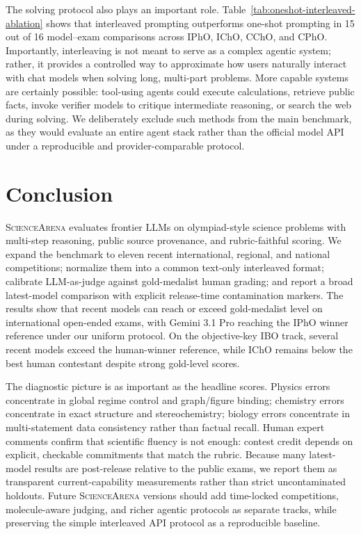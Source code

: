 \documentclass[11pt]{article}
\begin{document}
The solving protocol also plays an important role. Table~\ref{tab:oneshot-interleaved-ablation} shows that interleaved prompting outperforms one-shot prompting in 15 out of 16 model--exam comparisons across IPhO, IChO, CChO, and CPhO. Importantly, interleaving is not meant to serve as a complex agentic system; rather, it provides a controlled way to approximate how users naturally interact with chat models when solving long, multi-part problems. More capable systems are certainly possible: tool-using agents could execute calculations, retrieve public facts, invoke verifier models to critique intermediate reasoning, or search the web during solving. We deliberately exclude such methods from the main benchmark, as they would evaluate an entire agent stack rather than the official model API under a reproducible and provider-comparable protocol.




\section{Conclusion}
\textsc{ScienceArena} evaluates frontier LLMs on olympiad-style science problems with multi-step reasoning, public source provenance, and rubric-faithful scoring.
We expand the benchmark to eleven recent international, regional, and national competitions; normalize them into a common text-only interleaved format; calibrate LLM-as-judge against gold-medalist human grading; and report a broad latest-model comparison with explicit release-time contamination markers.
The results show that recent models can reach or exceed gold-medalist level on international open-ended exams, with Gemini 3.1 Pro reaching the IPhO winner reference under our uniform protocol.
On the objective-key IBO track, several recent models exceed the human-winner reference, while IChO remains below the best human contestant despite strong gold-level scores.

The diagnostic picture is as important as the headline scores.
Physics errors concentrate in global regime control and graph/figure binding; chemistry errors concentrate in exact structure and stereochemistry; biology errors concentrate in multi-statement data consistency rather than factual recall.
Human expert comments confirm that scientific fluency is not enough: contest credit depends on explicit, checkable commitments that match the rubric.
Because many latest-model results are post-release relative to the public exams, we report them as transparent current-capability measurements rather than strict uncontaminated holdouts.
Future \textsc{ScienceArena} versions should add time-locked competitions, molecule-aware judging, and richer agentic protocols as separate tracks, while preserving the simple interleaved API protocol as a reproducible baseline.
\end{document}
